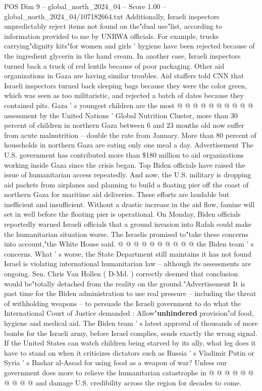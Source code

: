 \begin{textsample}{POS Dim 9 – global\_north\_2024\_04 – Score 1.00 – global\_north\_2024\_04/107182664.txt}
Additionally, Israeli inspectors unpredictably reject items not found on the"dual use"list, according to information provided to me by UNRWA officials.
For example, trucks carrying"dignity kits"for women and girls ' hygiene have been rejected because of the ingredient glycerin in the hand cream.
In another case, Israeli inspectors turned back a truck of red lentils because of poor packaging.
Other aid organizations in Gaza are having similar troubles.
Aid staffers told CNN that Israeli inspectors turned back sleeping bags because they were the color green, which was seen as too militaristic, and rejected a batch of dates because they contained pits.
Gaza ' s youngest children are the most @ @ @ @ @ @ @ @ @ @ assessment by the United Nations ' Global Nutrition Cluster, more than 30 percent of children in northern Gaza between 6 and 23 months old now suffer from acute malnutrition -- double the rate from January.
More than 80 percent of households in northern Gaza are eating only one meal a day.
Advertisement The U.S. government has contributed more than \$180 million to aid organizations working inside Gaza since the crisis began.
Top Biden officials have raised the issue of humanitarian access repeatedly.
And now, the U.S. military is dropping aid packets from airplanes and planning to build a floating pier off the coast of northern Gaza for maritime aid deliveries.
These efforts are laudable but inefficient and insufficient.
Without a drastic increase in the aid flow, famine will set in well before the floating pier is operational.
On Monday, Biden officials reportedly warned Israeli officials that a ground invasion into Rafah could make the humanitarian situation worse.
The Israelis promised to"take these concerns into account,"the White House said. @ @ @ @ @ @ @ @ @ @ the Biden team ' s concerns.
What ' s worse, the State Department still maintains it has not found Israel is violating international humanitarian law -- although its assessments are ongoing.
Sen.
Chris Van Hollen ( D-Md. ) correctly deemed that conclusion would be"totally detached from the reality on the ground."Advertisement It is past time for the Biden administration to use real pressure -- including the threat of withholding weapons -- to persuade the Israeli government to do what the International Court of Justice demanded : Allow"\textbf{unhindered} provision"of food, hygiene and medical aid.
The Biden team ' s latest approval of thousands of more bombs for the Israeli army, before Israel complies, sends exactly the wrong signal.
If the United States can watch children being starved by its ally, what leg does it have to stand on when it criticizes dictators such as Russia ' s Vladimir Putin or Syria ' s Bashar al-Assad for using food as a weapon of war?
Unless our government does more to relieve the humanitarian catastrophe in @ @ @ @ @ @ @ @ @ @ and damage U.S. credibility across the region for decades to come.

\end{textsample}
